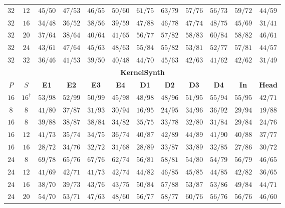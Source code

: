 \begin{table}[!tbp]
\begin{tabular}{@{}cccccccccccc@{}}
        $32$ & $12$ & $45/50$ & $47/53$ & $46/55$ & $50/60$ & $61/75$ & $63/79$ & $57/76$ & $56/73$ & $59/72$ & $44/59$ \\
        $32$ & $16$ & $34/48$ & $36/52$ & $38/56$ & $39/59$ & $47/88$ & $46/78$ & $47/74$ & $48/75$ & $45/69$ & $31/41$ \\
        $32$ & $20$ & $37/64$ & $38/64$ & $40/64$ & $41/65$ & $56/77$ & $57/82$ & $58/83$ & $60/84$ & $58/82$ & $46/61$ \\
        $32$ & $24$ & $43/61$ & $47/64$ & $45/63$ & $48/63$ & $55/84$ & $55/82$ & $53/81$ & $52/77$ & $57/81$ & $44/57$ \\
        $32$ & $32$ & $36/46$ & $41/53$ & $39/50$ & $40/48$ & $44/70$ & $45/63$ & $42/63$ & $41/62$ & $42/62$ & $31/49$ \\
        \midrule
        \multicolumn{12}{c}{\textbf{KernelSynth}} \\
        \midrule
        \textbf{$P$} & \textbf{$S$} & \textbf{E1} & \textbf{E2} & \textbf{E3} & \textbf{E4} & \textbf{D1} & \textbf{D2} & \textbf{D3} & \textbf{D4} & \textbf{In} & \textbf{Head} \\
        \midrule
        $16$ & $16^{\dagger}$ & $53/98$ & $52/99$ & $50/99$ & $45/98$ & $48/98$ & $48/96$ & $51/95$ & $55/94$ & $55/95$ & $42/71$ \\
        \midrule
        \addlinespace[2pt]
        $8$ & $8$ & $41/80$ & $37/87$ & $31/93$ & $30/94$ & $16/95$ & $24/95$ & $34/96$ & $36/92$ & $29/94$ & $19/88$ \\
        \addlinespace[2pt]
        $16$ & $8$ & $39/88$ & $38/87$ & $38/84$ & $34/82$ & $35/75$ & $33/78$ & $32/80$ & $31/84$ & $29/84$ & $24/76$ \\
        $16$ & $12$ & $41/73$ & $35/74$ & $34/75$ & $36/74$ & $40/87$ & $42/89$ & $44/89$ & $41/90$ & $40/88$ & $37/77$ \\
        $16$ & $16$ & $28/72$ & $34/76$ & $32/72$ & $31/68$ & $28/89$ & $33/87$ & $33/89$ & $32/85$ & $27/86$ & $30/72$ \\
        \addlinespace[2pt]
        $24$ & $8$ & $69/78$ & $65/76$ & $67/76$ & $62/74$ & $56/81$ & $58/81$ & $54/80$ & $54/79$ & $56/79$ & $46/65$ \\
        $24$ & $12$ & $41/69$ & $42/71$ & $41/73$ & $42/74$ & $44/82$ & $46/85$ & $45/85$ & $44/85$ & $42/82$ & $36/65$ \\
        $24$ & $16$ & $38/70$ & $39/73$ & $43/76$ & $43/75$ & $50/84$ & $57/88$ & $53/87$ & $53/86$ & $49/84$ & $44/71$ \\
        $24$ & $20$ & $54/70$ & $53/71$ & $47/63$ & $48/60$ & $56/77$ & $58/77$ & $60/76$ & $56/76$ & $56/76$ & $46/60$ \\

\end{tabular}
\end{table}
